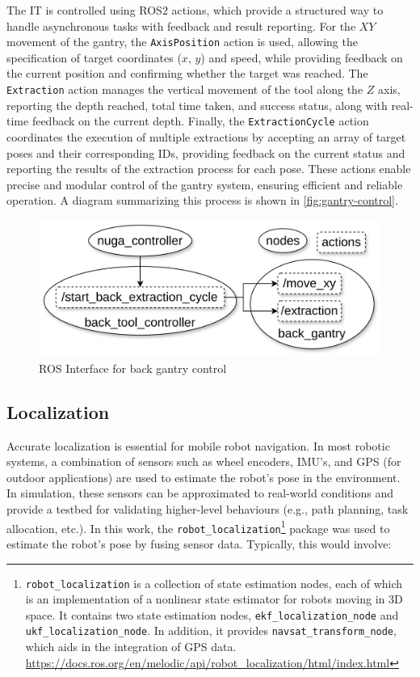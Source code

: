 The \ac{IT} is controlled using ROS$2$ actions, which provide a structured way to handle asynchronous tasks with feedback and result reporting. For the $XY$ movement of the gantry, the \texttt{AxisPosition} action is used, allowing the specification of target coordinates ($x$, $y$) and speed, while providing feedback on the current position and confirming whether the target was reached. The \texttt{Extraction} action manages the vertical movement of the tool along the $Z$ axis, reporting the depth reached, total time taken, and success status, along with real-time feedback on the current depth. Finally, the \texttt{ExtractionCycle} action coordinates the execution of multiple extractions by accepting an array of target poses and their corresponding IDs, providing feedback on the current status and reporting the results of the extraction process for each pose. These actions enable precise and modular control of the gantry system, ensuring efficient and reliable operation. A diagram summarizing this process is shown in \autoref{fig:gantry-control}.

\begin{figure}[h]
    \centering
    \includegraphics[width=0.7\linewidth]{gfx/ch03/gantry_control.png}
    \caption{ROS Interface for back gantry control}
    \label{fig:gantry-control}
\end{figure}


\subsection{Localization}
Accurate localization is essential for mobile robot navigation. In most robotic systems, a combination of sensors such as wheel encoders, IMU's, and GPS (for outdoor applications) are used to estimate the robot's pose in the environment. In simulation, these sensors can be approximated to real-world conditions and provide a testbed for validating higher-level behaviours (e.g., path planning, task allocation, etc.). In this work, the \texttt{robot\_localization}\footnote{\texttt{robot\_localization} is a collection of state estimation nodes, each of which is an implementation of a nonlinear state estimator for robots moving in 3D space. It contains two state estimation nodes, \texttt{ekf\_localization\_node} and \texttt{ukf\_localization\_node}. In addition, it provides \texttt{navsat\_transform\_node}, which aids in the integration of GPS data. \url{https://docs.ros.org/en/melodic/api/robot_localization/html/index.html}} package was used to estimate the robot's pose by fusing sensor data. Typically, this would involve:

